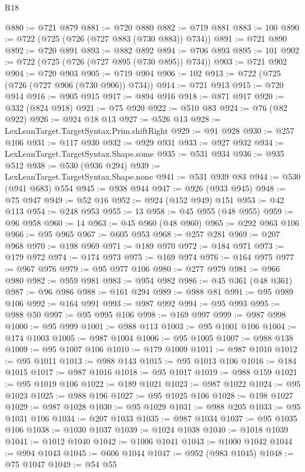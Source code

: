 \begin{lexlean}{R18}
\begin{coremodule}
@880 := @721 @879
@881 := @720 @880
@882 := @719 @881
@883 := 100
@890 := @722 (@725 (@726 (@727 @883 (@730 @883)) @734))
@891 := @721 @890
@892 := @720 @891
@893 := @882 @892
@894 := @706 @893
@895 := 101
@902 := @722 (@725 (@726 (@727 @895 (@730 @895)) @734))
@903 := @721 @902
@904 := @720 @903
@905 := @719 @904
@906 := 102
@913 := @722 (@725 (@726 (@727 @906 (@730 @906)) @734))
@914 := @721 @913
@915 := @720 @914
@916 := @905 @915
@917 := @894 @916
@918 := @871 @917
@920 := @332 (@824 @918)
@921 := @75 @920
@922 := @510 @83
@924 := @76 (@82 @922)
@926 := @924 @18 @13
@927 := @526 @13
@928 := LexLeanTarget.TargetSyntax.Prim.shiftRight
@929 := @91 @928
@930 := @257 @106
@931 := @117 @930
@932 := @929 @931
@933 := @927 @932
@934 := LexLeanTarget.TargetSyntax.Shape.some
@935 := @531 @934
@936 := @935 @512
@938 := @530 (@936 @294)
@939 := LexLeanTarget.TargetSyntax.Shape.none
@941 := @531 @939 @83
@944 := @530 (@941 @683) @554
@945 := @938 @944
@947 := @926 (@933 @945)
@948 := @75 @947
@949 := @52 @16
@952 := @924 (@152 @949) @151
@953 := @42 @113
@954 := @248 @953
@955 := 13
@958 := @45 @955 (@48 @955)
@959 := @96 @958
@960 := 14
@963 := @45 @960 (@48 @960)
@965 := @292 @963 @106
@966 := @95 @965
@967 := @605 @953
@968 := @257 @281
@969 := @207 @968
@970 := @198 @969
@971 := @189 @970
@972 := @184 @971
@973 := @179 @972
@974 := @174 @973
@975 := @169 @974
@976 := @164 @975
@977 := @967 @976
@979 := @95 @977 @106
@980 := @277 @979
@981 := @966 @980
@982 := @959 @981
@983 := @954 @982
@986 := @45 @361 (@48 @361)
@987 := @96 @986
@988 := @161 @294
@989 := @988 @81
@991 := @95 @989 @106
@992 := @164 @991
@993 := @987 @992
@994 := @95 @993
@995 := @988 @50
@997 := @95 @995 @106
@998 := @169 @997
@999 := @987 @998
@1000 := @95 @999
@1001 := @988 @113
@1003 := @95 @1001 @106
@1004 := @174 @1003
@1005 := @987 @1004
@1006 := @95 @1005
@1007 := @988 @138
@1009 := @95 @1007 @106
@1010 := @179 @1009
@1011 := @987 @1010
@1012 := @95 @1011
@1013 := @988 @143
@1015 := @95 @1013 @106
@1016 := @184 @1015
@1017 := @987 @1016
@1018 := @95 @1017
@1019 := @988 @159
@1021 := @95 @1019 @106
@1022 := @189 @1021
@1023 := @987 @1022
@1024 := @95 @1023
@1025 := @988 @196
@1027 := @95 @1025 @106
@1028 := @198 @1027
@1029 := @987 @1028
@1030 := @95 @1029
@1031 := @988 @205
@1033 := @95 @1031 @106
@1034 := @207 @1033
@1035 := @987 @1034
@1037 := @95 @1035 @106
@1038 := @1030 @1037
@1039 := @1024 @1038
@1040 := @1018 @1039
@1041 := @1012 @1040
@1042 := @1006 @1041
@1043 := @1000 @1042
@1044 := @994 @1043
@1045 := @606 @1044
@1047 := @952 (@983 @1045)
@1048 := @75 @1047
@1049 := @54 @55

\end{coremodule}
\end{lexlean}
